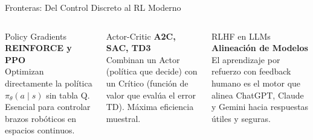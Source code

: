 \begin{frame}{Fronteras: Del Control Discreto al RL Moderno}
  \begin{columns}[T,onlytextwidth]
      \begin{block}{Policy Gradients}
        \textbf{REINFORCE y PPO}\\
        \vspace{0.15cm}
        Optimizan directamente la política $\pi_\theta(a \mid s)$ sin tabla Q. Esencial para controlar brazos robóticos en espacios continuos.
      \end{block}
      \begin{alertblock}{Actor-Critic}
        \textbf{A2C, SAC, TD3}\\
        \vspace{0.15cm}
        Combinan un Actor (política que decide) con un Crítico (función de valor que evalúa el error TD). Máxima eficiencia muestral.
      \end{alertblock}
      \begin{exampleblock}{RLHF en LLMs}
        \textbf{Alineación de Modelos}\\
        \vspace{0.15cm}
        El aprendizaje por refuerzo con feedback humano es el motor que alinea ChatGPT, Claude y Gemini hacia respuestas útiles y seguras.
      \end{exampleblock}
  \end{columns}
  \vspace{0.4cm}
\end{frame}
